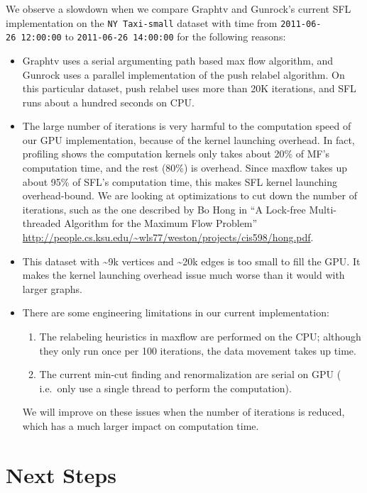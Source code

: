 \documentclass[10pt,oneside]{memoir}
\begin{document}
We observe a slowdown when we compare Graphtv and Gunrock's current SFL
implementation on the \texttt{NY\ Taxi-small} dataset with time from
\texttt{2011-06-26\ 12:00:00} to \texttt{2011-06-26\ 14:00:00} for the
following reasons:

\begin{itemize}
\item
  Graphtv uses a serial argumenting path based max flow algorithm, and
  Gunrock uses a parallel implementation of the push relabel algorithm.
  On this particular dataset, push relabel uses more than 20K
  iterations, and SFL runs about a hundred seconds on CPU.
\item
  The large number of iterations is very harmful to the computation
  speed of our GPU implementation, because of the kernel launching
  overhead. In fact, profiling shows the computation kernels only takes
  about 20\% of MF's computation time, and the rest (80\%) is overhead.
  Since maxflow takes up about 95\% of SFL's computation time, this
  makes SFL kernel launching overhead-bound. We are looking at
  optimizations to cut down the number of iterations, such as the one
  described by Bo Hong in ``A Lock-free Multi-threaded Algorithm for the
  Maximum Flow Problem''
  \url{http://people.cs.ksu.edu/~wls77/weston/projects/cis598/hong.pdf}.
\item
  This dataset with \textasciitilde{}9k vertices and
  \textasciitilde{}20k edges is too small to fill the GPU. It makes the
  kernel launching overhead issue much worse than it would with larger
  graphs.
\item
  There are some engineering limitations in our current implementation:

  \begin{enumerate}
  \def\labelenumi{\arabic{enumi}.}
  \item
    The relabeling heuristics in maxflow are performed on the CPU;
    although they only run once per 100 iterations, the data movement
    takes up time.
  \item
    The current min-cut finding and renormalization are serial on GPU (
    i.e.~only use a single thread to perform the computation).
  \end{enumerate}

  We will improve on these issues when the number of iterations is
  reduced, which has a much larger impact on computation time.
\end{itemize}

\hypertarget{next-steps-8}{%
\section{Next Steps}\label{next-steps-8}}
\end{document}
